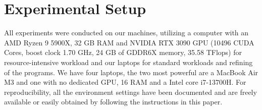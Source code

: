 \section{Experimental Setup}
\label{sec:setup}
All experiments were conducted on our machines, utilizing a computer with an AMD Ryzen 9 5900X, 32 GB RAM and NVIDIA RTX 3090 GPU (10496 CUDA Cores, boost clock 1.70 GHz, 24 GB of GDDR6X memory, 35.58 TFlops) for resource-intensive workload and our laptops for standard workloads and refining of the programs. We have four laptops, the two most powerful are a MacBook Air M3 and one with no dedicated GPU, 16 RAM and a Intel core i7-13700H. 
For reproducibility, all the environment settings have been documented and are freely available or easily obtained by following the instructions in this paper.


